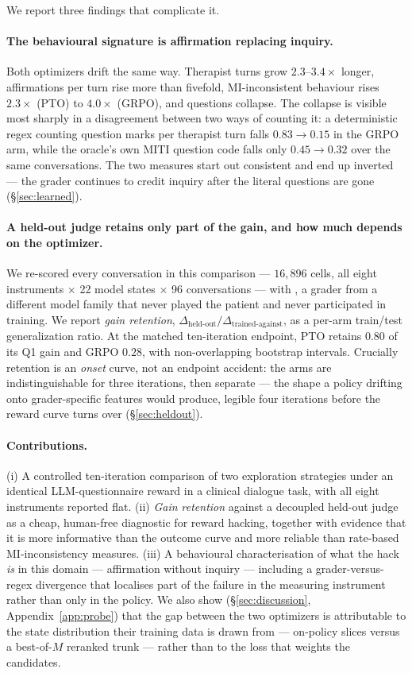 We report three findings that complicate it.

\paragraph{The behavioural signature is affirmation replacing inquiry.} Both optimizers
drift the same way. Therapist turns grow $2.3$--$3.4\times$ longer, affirmations per turn
rise more than fivefold, MI-inconsistent behaviour rises $2.3\times$ (PTO) to $4.0\times$
(GRPO), and questions collapse. The collapse is visible most sharply in a disagreement
between two ways of counting it: a deterministic regex counting question marks per therapist
turn falls $0.83\!\rightarrow\!0.15$ in the GRPO arm, while the oracle's own MITI question
code falls only $0.45\!\rightarrow\!0.32$ over the same conversations. The two measures
start out consistent and end up inverted --- the grader continues to credit inquiry after
the literal questions are gone (\S\ref{sec:learned}).

\paragraph{A held-out judge retains only part of the gain, and how much depends on the
optimizer.} We re-scored every conversation in this comparison --- $16{,}896$ cells, all
eight instruments $\times$ 22 model states $\times$ 96 conversations --- with \heldoutjudge{}, a
grader from a different model family that never played the patient and never participated in
training. We report \emph{gain retention}, $\Delta_\text{held-out}/\Delta_\text{trained-against}$,
as a per-arm train/test generalization ratio. At the matched ten-iteration endpoint, PTO
retains $0.80$ of its Q1 gain and GRPO $0.28$, with non-overlapping bootstrap intervals.
Crucially retention is an \emph{onset} curve, not an endpoint accident: the arms are
indistinguishable for three iterations, then separate --- the shape a policy drifting onto
grader-specific features would produce, legible four iterations before the reward curve turns
over (\S\ref{sec:heldout}).

\paragraph{Contributions.} (i) A controlled ten-iteration comparison of two exploration
strategies under an identical LLM-questionnaire reward in a clinical dialogue task, with all
eight instruments reported flat. (ii) \emph{Gain retention} against a decoupled held-out
judge as a cheap, human-free diagnostic for reward hacking, together with evidence that it is
more informative than the outcome curve and more reliable than rate-based MI-inconsistency
measures. (iii) A behavioural characterisation of what the hack \emph{is} in this domain ---
affirmation without inquiry --- including a grader-versus-regex divergence that localises
part of the failure in the measuring instrument rather than only in the policy. We also show
(\S\ref{sec:discussion}, Appendix~\ref{app:probe}) that the gap between the two optimizers is
attributable to the state distribution their training data is drawn from --- on-policy slices
versus a best-of-$M$ reranked trunk --- rather than to the loss that weights the candidates.
